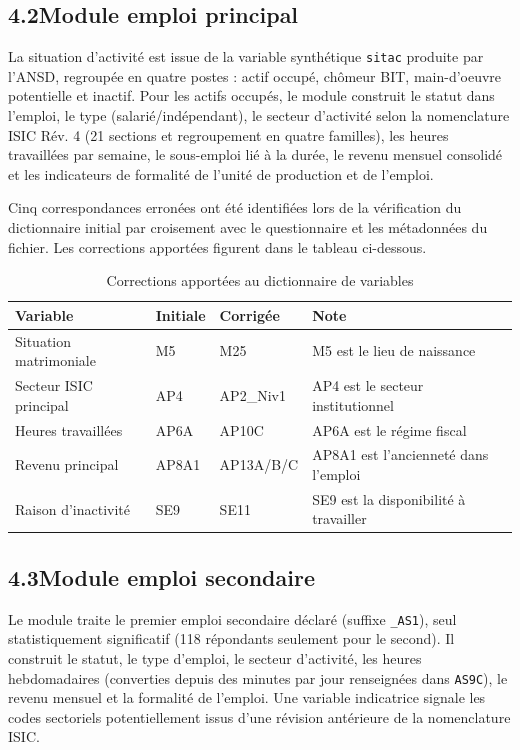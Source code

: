\documentclass[12pt,a4paper]{article}
\begin{document}
\subsection*{4.2\quad Module emploi principal}

La situation d'activité est issue de la variable synthétique \texttt{sitac}
produite par l'ANSD, regroupée en quatre postes : actif occupé, chômeur BIT,
main-d'oeuvre potentielle et inactif. Pour les actifs occupés, le module
construit le statut dans l'emploi, le type (salarié/indépendant), le secteur
d'activité selon la nomenclature ISIC Rév. 4 (21 sections et regroupement en
quatre familles), les heures travaillées par semaine, le sous-emploi lié à la
durée, le revenu mensuel consolidé et les indicateurs de formalité de l'unité
de production et de l'emploi.

Cinq correspondances erronées ont été identifiées lors de la vérification du
dictionnaire initial par croisement avec le questionnaire et les métadonnées
du fichier. Les corrections apportées figurent dans le tableau ci-dessous.

\begin{table}[h!]
\centering
\begin{tabularx}{\linewidth}{lllX}
\toprule
\textbf{Variable} & \textbf{Initiale} & \textbf{Corrigée} & \textbf{Note} \\
\midrule
Situation matrimoniale    & M5     & M25    & M5 est le lieu de naissance \\
Secteur ISIC principal    & AP4    & AP2\_Niv1 & AP4 est le secteur institutionnel \\
Heures travaillées        & AP6A   & AP10C  & AP6A est le régime fiscal \\
Revenu principal          & AP8A1  & AP13A/B/C & AP8A1 est l'ancienneté dans l'emploi \\
Raison d'inactivité       & SE9    & SE11   & SE9 est la disponibilité à travailler \\
\bottomrule
\end{tabularx}
\caption{Corrections apportées au dictionnaire de variables}
\end{table}

\subsection*{4.3\quad Module emploi secondaire}

Le module traite le premier emploi secondaire déclaré (suffixe \texttt{\_AS1}),
seul statistiquement significatif (118 répondants seulement pour le second).
Il construit le statut, le type d'emploi, le secteur d'activité, les heures
hebdomadaires (converties depuis des minutes par jour renseignées dans
\texttt{AS9C}), le revenu mensuel et la formalité de l'emploi. Une variable
indicatrice signale les codes sectoriels potentiellement issus d'une révision
antérieure de la nomenclature ISIC.
\end{document}
